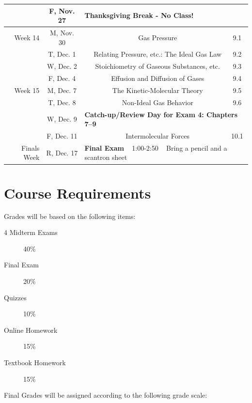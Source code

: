 \documentclass[12pt, letterpaper]{article}
\begin{document}
\begin{tabular}{rcccc}
	            & F, Nov. 27 & \multicolumn{3}{l}{\textbf{Thanksgiving Break - No Class!}}                                                                                      \\
	\midrule
	Week 14     & M, Nov. 30 &                                                                                           & Gas Pressure                               & 9.1     \\
	            & T, Dec. 1  &                                                                                           & Relating Pressure, etc.: The Ideal Gas Law & 9.2     \\
	            & W, Dec. 2  &                                                                                           & Stoichiometry of Gaseous Substances, etc.  & 9.3     \\
	            & F, Dec. 4  &                                                                                           & Effusion and Diffusion of Gases            & 9.4     \\
	\midrule
	Week 15     & M, Dec. 7  &                                                                                           & The Kinetic-Molecular Theory               & 9.5     \\
	            & T, Dec. 8  &                                                                                           & Non-Ideal Gas Behavior                     & 9.6     \\
	            & W, Dec. 9  & \multicolumn{3}{l}{\textbf{Catch-up/Review Day for Exam 4: Chapters 7--9}}                                                                       \\
	            & F, Dec. 11 &                                                                                           & Intermolecular Forces                      & 10.1    \\
	\midrule
	\midrule
	Finals Week & R, Dec. 17 & \multicolumn{3}{l}{\textbf{Final Exam} ~ 1:00-2:50 ~ Bring a pencil and a scantron sheet}                                                        \\
\end{tabular}

\section*{Course Requirements}
Grades will be based on the following items:
\begin{description}
	\item[4 Midterm Exams] 40\%
	\item[Final Exam] 20\%
	\item[Quizzes] 10\%
	\item[Online Homework] 15\%
	\item[Textbook Homework] 15\%
\end{description}
Final Grades will be assigned according to the following grade scale:
\end{document}
